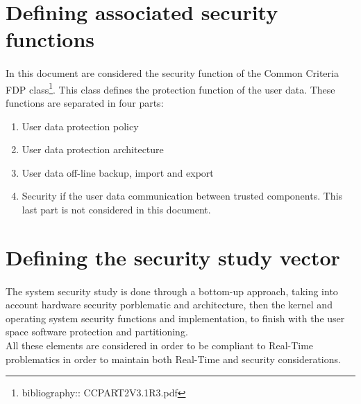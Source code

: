 \section{Defining associated security functions}
\label{sec:cc_fdp}

\paragraph{}
In this document are considered the security function of the Common Criteria FDP
class\footnote{bibliography:\FIXME: CCPART2V3.1R3.pdf}. This class defines the protection function
of the user data. These functions are separated in four parts:
\begin{enumerate}
\item User data protection policy
\item User data protection architecture
\item User data off-line backup, import and export
\item Security if the user data communication between trusted components. This last part is not
considered in this document.
\end{enumerate}

\section{Defining the security study vector}

\paragraph{}
The system security study is done through a bottom-up approach, taking into account hardware
security porblematic and architecture, then the kernel and operating system security functions and
implementation, to finish with the user space software protection and partitioning.\\
All these elements are considered in order to be compliant to Real-Time problematics in order to
maintain both Real-Time and security considerations.
